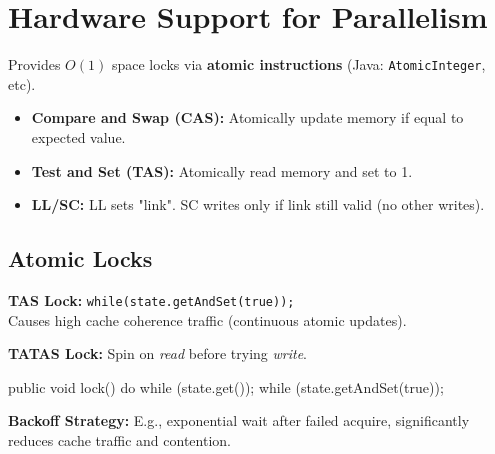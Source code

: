 \section{Hardware Support for Parallelism}

Provides $O(1)$ space locks via \textbf{atomic instructions} (Java: \texttt{AtomicInteger}, etc). 

\begin{definition}
    \begin{itemize}
        \item \textbf{Compare and Swap (CAS):} Atomically update memory if equal to expected value.
        \item \textbf{Test and Set (TAS):} Atomically read memory and set to 1.
        \item \textbf{LL/SC:} LL sets "link". SC writes only if link still valid (no other writes).
    \end{itemize}
\end{definition}

\subsection{Atomic Locks}

\textbf{TAS Lock:} \texttt{while(state.getAndSet(true));} \\
Causes high cache coherence traffic (continuous atomic updates).

\textbf{TATAS Lock:} Spin on \textit{read} before trying \textit{write}.
\begin{codeexample}
public void lock() {
    do { while (state.get()); } 
    while (state.getAndSet(true));
}
\end{codeexample}

\begin{remark}
    \textbf{Backoff Strategy:} E.g., exponential wait after failed acquire, significantly reduces cache traffic and contention.
\end{remark}
